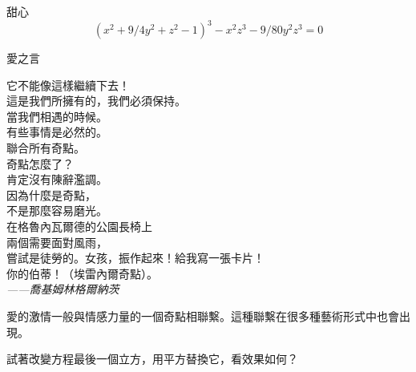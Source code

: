 \begin{surferPage}{甜心}
\[(x^2+ 9/4y^2	+ z^2- 1)^3- x^2z^3	- 9/80y^2z^3	= 0\]

\singlespacing
愛之言
\singlespacing

它不能像這樣繼續下去！\\
這是我們所擁有的，我們必須保持。\\
當我們相遇的時候。\\
有些事情是必然的。\\
聯合所有奇點。\\
奇點怎麼了？\\
肯定沒有陳辭濫調。\\
因為什麼是奇點，\\
不是那麼容易磨光。\\
在格魯內瓦爾德的公園長椅上\\
兩個需要面對風雨，\\
嘗試是徒勞的。女孩，振作起來！給我寫一張卡片！\\
你的伯蒂！（埃雷內爾奇點）。\\
\textit{——喬基姆林格爾納茨}

\singlespacing
愛的激情一般與情感力量的一個奇點相聯繫。這種聯繫在很多種藝術形式中也會出現。

\singlespacing
試著改變方程最後一個立方，用平方替換它，看效果如何？
\end{surferPage}
